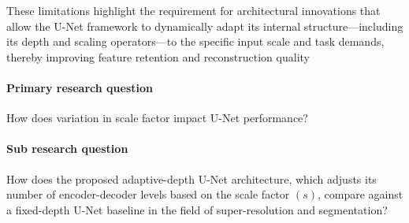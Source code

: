 These limitations highlight the requirement for architectural innovations that allow the U-Net framework to dynamically adapt its internal structure—including its depth and scaling operators—to the specific input scale and task demands, thereby improving feature retention and reconstruction quality

 

\paragraph{Primary research question}
How does variation in scale factor impact U-Net performance? 

\paragraph{Sub research question}
How does the proposed adaptive-depth U-Net architecture, which adjusts its number of encoder-decoder levels based on the scale factor $(s)$, compare against a fixed-depth U-Net baseline in the field of super-resolution and segmentation? 

